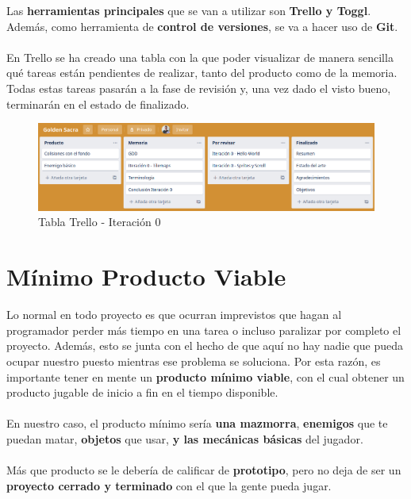 \clearpage

Las \textbf{herramientas principales} que se van a utilizar son \textbf{Trello y Toggl}. Además, como herramienta de \textbf{control de versiones}, se va a hacer uso de \textbf{Git}.
\\ \\
En Trello se ha creado una tabla con la que poder visualizar de manera sencilla qué tareas están pendientes de realizar, tanto del producto como de la memoria. Todas estas tareas pasarán a la fase de revisión y, una vez dado el visto bueno, terminarán en el estado de finalizado.

\begin{figure}[h]
\centering
\includegraphics[width=1\textwidth]{include/images/gdd/trello.png}
\caption{Tabla Trello - Iteración 0}
\label{figure:trello}
\end{figure}
	
\section{Mínimo Producto Viable}

Lo normal en todo proyecto es que ocurran imprevistos que hagan al programador perder más tiempo en una tarea o incluso paralizar por completo el proyecto. Además, esto se junta con el hecho de que aquí no hay nadie que pueda ocupar nuestro puesto mientras ese problema se soluciona. Por esta razón, es importante tener en mente un \textbf{producto mínimo viable}, con el cual obtener un producto jugable de inicio a fin en el tiempo disponible.
\\ \\
En nuestro caso, el producto mínimo sería \textbf{una mazmorra}, \textbf{enemigos} que te puedan matar, \textbf{objetos} que usar, \textbf{y las mecánicas básicas} del jugador.
\\ \\
Más que producto se le debería de calificar de \textbf{prototipo}, pero no deja de ser un \textbf{proyecto cerrado y terminado} con el que la gente pueda jugar.
	
\cleardoublepage






